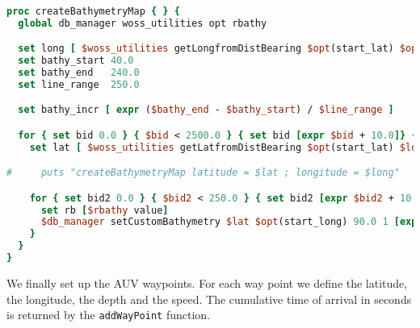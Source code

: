\documentclass[11pt]{article}
\begin{document}
{\scriptsize\tt
\begin{lstlisting}[language=tcl,showstringspaces=false]
proc createBathymetryMap { } {
  global db_manager woss_utilities opt rbathy

  set long [ $woss_utilities getLongfromDistBearing $opt(start_lat) $opt(start_long) -90.0 500.0 ]
  set bathy_start 40.0
  set bathy_end   240.0
  set line_range  250.0

  set bathy_incr [ expr ($bathy_end - $bathy_start) / $line_range ]

  for { set bid 0.0 } { $bid < 2500.0 } { set bid [expr $bid + 10.0]} {
    set lat [ $woss_utilities getLatfromDistBearing $opt(start_lat) $long 180.0 $bid ]

#     puts "createBathymetryMap latitude = $lat ; longitude = $long"

    for { set bid2 0.0 } { $bid2 < 250.0 } { set bid2 [expr $bid2 + 10.0] } {
      set rb [$rbathy value]
      $db_manager setCustomBathymetry $lat $opt(start_long) 90.0 1 [expr 10.0 * $bid2] [expr $bathy_start + $bid2 * $bathy_incr + $rb ] 
    }   
  }
}
\end{lstlisting}
}
\vspace{\baselinestretch\baselineskip}

We finally set up the AUV waypoints. 
For each way point we define the latitude, the longitude, the depth and the speed.
The cumulative time of arrival in seconds is returned by the {\tt addWayPoint} function.
\end{document}

